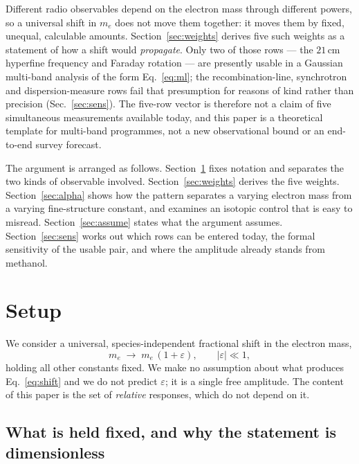 \documentclass[aps,prd,twocolumn,superscriptaddress,nofootinbib,10pt]{revtex4-2}
\begin{document}
Different radio observables depend on the electron mass through different powers, so a universal
shift in $m_e$ does not move them together: it moves them by fixed, unequal, calculable amounts.
Section~\ref{sec:weights} derives five such weights as a statement of how a shift would
\emph{propagate}. Only two of those rows --- the $21\,$cm hyperfine frequency and Faraday rotation
--- are presently usable in a Gaussian multi-band analysis of the form
Eq.~\eqref{eq:ml}; the recombination-line, synchrotron and dispersion-measure rows fail that
presumption for reasons of kind rather than precision (Sec.~\ref{sec:sens}). The five-row vector is
therefore not a claim of five simultaneous measurements available today, and this paper is a
theoretical template for multi-band programmes, not a new observational bound or an end-to-end
survey forecast.

The argument is arranged as follows. Section~\ref{sec:setup} fixes notation and separates the two
kinds of observable involved. Section~\ref{sec:weights} derives the five weights.
Section~\ref{sec:alpha} shows how the pattern separates a varying electron mass from a varying
fine-structure constant, and examines an isotopic control that is easy to misread.
Section~\ref{sec:assume} states what the argument assumes. Section~\ref{sec:sens} works out which
rows can be entered today, the formal sensitivity of the usable pair, and where the amplitude
already stands from methanol.

\section{Setup}\label{sec:setup}

We consider a universal, species-independent fractional shift in the electron mass,
%
\begin{equation}
  m_e \;\longrightarrow\; m_e\,(1+\varepsilon), \qquad |\varepsilon| \ll 1 ,
  \label{eq:shift}
\end{equation}
%
holding all other constants fixed. We make no assumption about what produces
Eq.~\eqref{eq:shift} and we do not predict $\varepsilon$; it is a single free amplitude. The
content of this paper is the set of \emph{relative} responses, which do not depend on it.

\subsection{What is held fixed, and why the statement is dimensionless}
\end{document}
